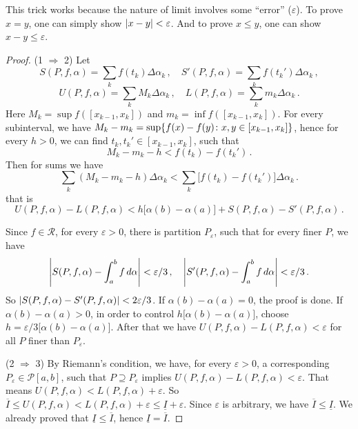 \documentclass{article}
\newcommand{\upI}{\overline{I}}
\newcommand{\lowI}{\underline{I}}
\newcommand{\Riemann}{\mathcal R}
\newcommand{\Partition}{\mathcal P}
\DeclarePairedDelimiter\set{\lbrace}{\rbrace}
\DeclarePairedDelimiter\abs{\lvert}{\rvert}
\newcommand{\finer}{\supseteq}
\newcommand{\dd}{\mathop{}\!d}
\begin{document}
This trick works because the nature of limit involves some ``error'' ($ \varepsilon $). To prove $ x = y $, one can simply show $ \abs{ x - y } < \varepsilon $. And to prove $ x \leqslant y $, one can show $ x - y \leqslant \varepsilon $.

\begin{proof}
    (1 $ \Rightarrow $ 2) 
    Let 
    \[ 
        S(P, f, \alpha) = \sum_{k} f(t_k) \Delta \alpha_k \,, \quad S'(P, f, \alpha) = \sum_{k} f(t_k') \Delta \alpha_k \,,
    \]
    \[ 
        U(P, f, \alpha) = \sum_{k} M_k \Delta \alpha_k \,, \quad L(P, f, \alpha) = \sum_{k} m_k \Delta \alpha_k \,.
    \]
    Here $ M_k = \sup f([x_{k-1}, x_k]) $ and $ m_k = \inf f([x_{k-1}, x_k]) $. For every subinterval, we have $ M_k - m_k = \sup \set{f(x) - f(y) \colon x, y \in [x_{k-1}, x_k]} $, hence for every $ h > 0 $, we can find $ t_k, t_k' \in [x_{k-1}, x_k] $, such that
    \[ 
        M_k - m_k - h < f(t_k) - f(t_k') \,.
    \]
    Then for sums we have
    \[ 
        \sum_{k} (M_k - m_k - h) \Delta \alpha_k  < \sum_{k} \big[ f(t_k) - f(t_k') \big] \Delta \alpha_k \,.
    \]
    that is
    \[ 
        U(P, f, \alpha) - L(P, f, \alpha) < h \big[ \alpha(b) - \alpha(a) \big] + S(P, f, \alpha) - S'(P, f, \alpha) \,.
    \]

    
    
    Since $ f \in \Riemann $, for every $ \varepsilon > 0 $, there is partition $ P_\varepsilon $, such that for every finer $ P $, we have
    \[ 
        \abs*{ S(P, f, \alpha) - \int_a^b f \dd \alpha } < \varepsilon / 3 \,, \quad \abs*{ S'(P, f, \alpha) - \int_a^b f \dd \alpha } < \varepsilon / 3 \,.
    \]
    So $ \abs{ S(P, f, \alpha) - S'(P, f, \alpha) } < 2 \varepsilon / 3 $. If $ \alpha(b) - \alpha(a) = 0 $, the proof is done. If $ \alpha(b) - \alpha(a) > 0 $, in order to control $ h \big[ \alpha(b) - \alpha(a) \big] $, choose $ h = \varepsilon / 3\big[ \alpha(b) - \alpha(a) \big] $. After that we have $ U(P, f, \alpha) - L(P, f, \alpha) < \varepsilon $ for all $ P $ finer than $ P_\varepsilon $.

    
    (2 $ \Rightarrow $ 3) By Riemann's condition, we have, for every $ \varepsilon > 0 $, a corresponding $ P_\varepsilon \in \Partition[a, b] $, such that $ P \finer P_\varepsilon $ implies $ U(P, f, \alpha) - L(P, f, \alpha) < \varepsilon $. That means $ U(P, f, \alpha) < L(P, f, \alpha) + \varepsilon $. So $ \upI \leqslant U(P, f, \alpha) < L(P, f, \alpha) + \varepsilon \leqslant \lowI + \varepsilon $. Since $ \varepsilon $ is arbitrary, we have $ \upI \leqslant \lowI $. We already proved that $ \lowI \leqslant \upI $, hence $ \lowI = \upI $.
    

\end{proof}
\end{document}
